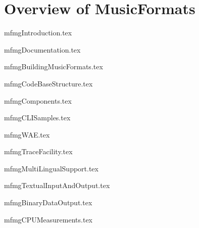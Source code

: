 



\part{Overview of MusicFormats}

\useRegularPagesHeadersAndFooters


{mfmgIntroduction.tex}

{mfmgDocumentation.tex}

{mfmgBuildingMusicFormats.tex}

{mfmgCodeBaseStructure.tex}

{mfmgComponents.tex}

{mfmgCLISamples.tex}

{mfmgWAE.tex}

{mfmgTraceFacility.tex}

{mfmgMultiLingualSupport.tex}

{mfmgTextualInputAndOutput.tex}

{mfmgBinaryDataOutput.tex}

{mfmgCPUMeasurements.tex}

